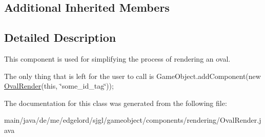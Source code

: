 \subsection*{Additional Inherited Members}


\subsection{Detailed Description}
This component is used for simplifying the process of rendering an oval. 

The only thing that is left for the user to call is {\ttfamily Game\+Object.\+add\+Component(new \mbox{\hyperlink{classde_1_1me_1_1edgelord_1_1sjgl_1_1gameobject_1_1components_1_1rendering_1_1_oval_render}{Oval\+Render}}(this, \char`\"{}some\+\_\+id\+\_\+tag\char`\"{}));}

The documentation for this class was generated from the following file\+:\begin{DoxyCompactItemize}
\item 
main/java/de/me/edgelord/sjgl/gameobject/components/rendering/Oval\+Render.\+java\end{DoxyCompactItemize}
